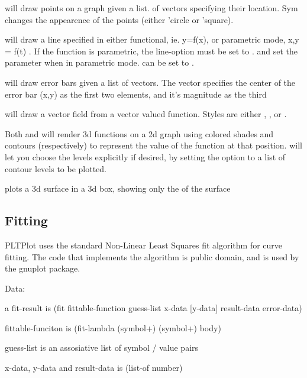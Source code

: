 \documentclass{article}
\begin{document}
{ will draw points on a graph given a list. of vectors specifying their location. Sym changes the appearence of the points (either 'circle or 'square).


 will draw a line specified in either functional, ie. y=f(x), or  parametric mode, x,y = f(t) . If the function is parametric, the line-option  must be set to .  and  set the parameter when in parametric mode.  can be set to .


 will draw error bars given a list of vectors. The vector specifies the  center of the error bar (x,y) as the first two elements, and it's magnitude as the third


 will draw a vector field from a vector valued function. Styles are either , , or . 


Both  and  will render 3d functions on a 2d graph using colored shades and contours (respectively) to represent the value of the function at that position.  will let you choose the levels explicitly if desired, by setting the  option to a list of contour levels to be plotted.

 plots a 3d surface in a 3d box, showing only the  of the surface

\subsection{Fitting}
\label{Fitting}


PLTPlot uses the standard Non-Linear Least Squares fit algorithm for curve fitting. The code that implements the algorithm is public domain, and is used by the gnuplot package.



\begin{schemedisplay}

Data:
       
a fit-result is 
  (fit fittable-function guess-list x-data [y-data] result-data error-data)       
  
fittable-funciton is
  (fit-lambda (symbol+) (symbol+) body)
  
guess-list is an assosiative list of symbol / value pairs
  
x-data, y-data and result-data is
  (list-of number)
  

\end{schemedisplay}}
\end{document}
